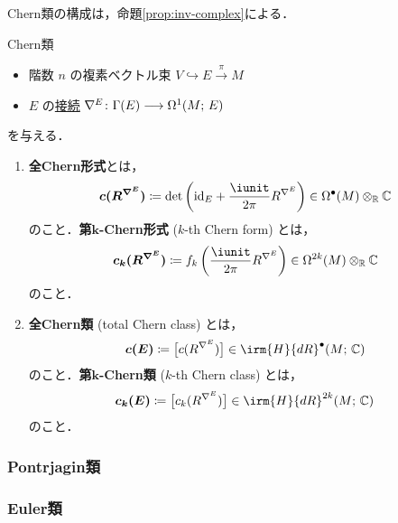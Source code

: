 \documentclass[TQFT_main]{subfiles}
\begin{document}
Chern類の構成は，命題\ref{prop:inv-complex}による．

\begin{mydef}[label=def:Chern-class,breakable]{Chern類}
    \begin{itemize}
        \item 階数 $n$ の複素ベクトル束 $V \hookrightarrow E \xrightarrow{\pi} M$
        \item $E$ の\hyperref[def:connection-vect]{接続} $\nabla^E \colon \Gamma(E) \longrightarrow \Omega^1(M;\, E)$
    \end{itemize}
    を与える．
    \begin{enumerate}
        \item \textbf{全Chern形式}とは，
        \begin{align}
            \bm{c (R^{\nabla^E})} \coloneqq \det \left( \mathrm{id}_E + \frac{\iunit}{2\pi} R^{\nabla^E} \right) \in \Omega^{\bullet}(M) \otimes_{\mathbb{R}} \mathbb{C}
        \end{align}
        のこと．\textbf{第$\bm{k}$-Chern形式} ($k$-th Chern form) とは，
        \begin{align}
            \bm{c_k (R^{\nabla^E})} \coloneqq f_k \left( \frac{\iunit}{2\pi} R^{\nabla^E} \right) \in \Omega^{2k}(M) \otimes_{\mathbb{R}} \mathbb{C}
        \end{align}
        のこと．
        \item \textbf{全Chern類} (total Chern class) とは，
        \begin{align}
            \bm{c(E)} \coloneqq \bigl[ c (R^{\nabla^E}) \bigr] \in \irm{H}{dR}^{\bullet} (M;\, \mathbb{C})
        \end{align}
        のこと．\textbf{第$\bm{k}$-Chern類} ($k$-th Chern class) とは，
        \begin{align}
            \bm{c_k (E)} \coloneqq \bigl[ c_k(R^{\nabla^E}) \bigr] \in \irm{H}{dR}^{2k} (M;\, \mathbb{C})
        \end{align}
        のこと．
    \end{enumerate}
\end{mydef}

\subsubsection{Pontrjagin類}


\subsubsection{Euler類}
\end{document}
